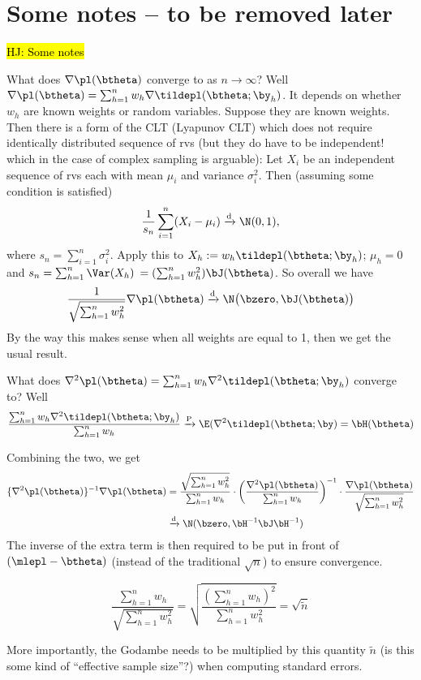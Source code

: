 
\section{Some notes -- to be removed later}

\hl{HJ: Some notes}

What does $\nabla\pl(\btheta)$ converge to as $n\to\infty$?
Well $\nabla\pl(\btheta)= \sum_{h=1}^n w_h \nabla\tildepl(\btheta;\by_h)$.
It depends on whether $w_h$ are known weights or random variables.
Suppose they are known weights.
Then there is a form of the CLT (Lyapunov CLT) which does not require identically distributed sequence of rvs (but they do have to be independent! which in the case of complex sampling is arguable):
Let $X_i$ be an independent sequence of rvs each with mean $\mu_i$ and variance $\sigma^2_i$. Then (assuming some condition is satisfied)
$$
\frac{1}{s_n} \sum_{i=1}^n (X_i -\mu_i) \xrightarrow{\text d} \N(0,1),
$$
where $s_n = \sum_{i=1}^n \sigma_i^2$.
Apply this to $X_h := w_h \tildepl(\btheta;\by_h)$; $\mu_h = 0$ and $s_n=\sum_{h=1}^n \Var(X_h)$ $ = (\sum_{h=1}^n w_h^2 )\bJ(\btheta)$.
So overall we have
$$
\frac{1}{\sqrt{\textstyle\sum_{h=1}^n w_h^2 }} \nabla\pl(\btheta) \xrightarrow{\text d} \N\big(\bzero, \bJ(\btheta)\big)
$$
By the way this makes sense when all weights are equal to 1, then we get the usual result.

What does $\nabla^2\pl(\btheta) = \sum_{h=1}^n w_h \nabla^2\tildepl(\btheta; \by_h)$ converge to?
Well 
$$
\frac{\sum_{h=1}^n w_h \nabla^2\tildepl(\btheta; \by_h)}{\sum_{h=1}^n w_h} \xrightarrow{\text P} \E(\nabla^2\tildepl(\btheta; \by) = \bH(\btheta)
$$

Combining the two, we get
\begin{align*}
\{\nabla^2 \pl(\btheta)\}^{-1} \nabla\pl(\btheta) 
&= \frac{\sqrt{\textstyle\sum_{h=1}^n w_h^2 }}{\sum_{h=1}^n w_h} \cdot \left(\frac{\nabla^2 \pl(\btheta)}{\sum_{h=1}^n w_h} \right)^{-1} \cdot \frac{\nabla \pl(\btheta)}{ \sqrt{\textstyle\sum_{h=1}^n w_h^2 }} \\
&\xrightarrow{\text d} \N(\bzero, \bH^{-1}\bJ\bH^{-1})
\end{align*}
The inverse of the extra term is then required to be put in front of $(\mlepl - \btheta)$ (instead of the traditional $\sqrt n$) to ensure convergence.

$$
\frac{\sum_{h=1}^n w_h}{\sqrt{\textstyle\sum_{h=1}^n w_h^2 }}
= \sqrt{ \frac{(\sum_{h=1}^n w_h)^2}{\sum_{h=1}^n w_h^2} } 
= \sqrt{\tilde n}
$$

More importantly, the Godambe needs to be multiplied by this quantity $\tilde n$ (is this some kind of ``effective sample size''?) when computing standard errors.
